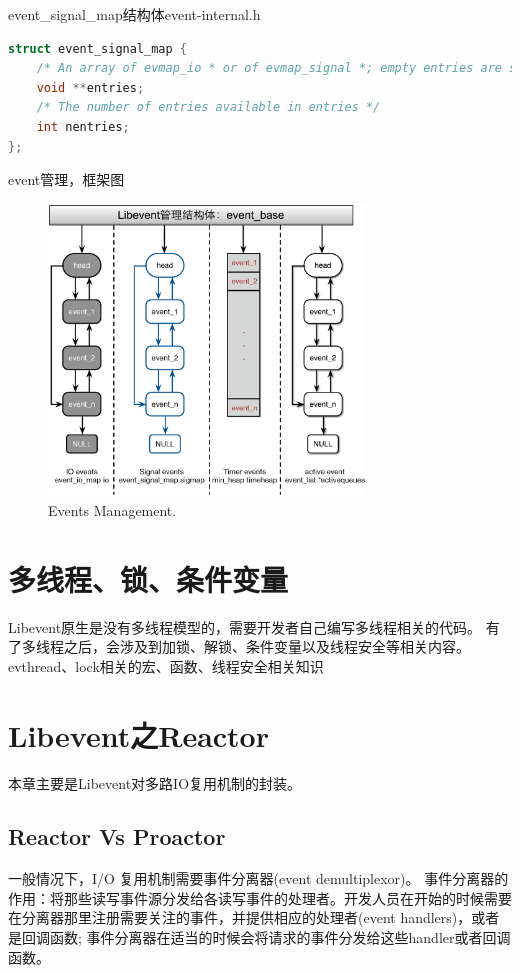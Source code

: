 \documentclass[11pt,a4paper]{article}
\begin{document}
event\_signal\_map结构体event-internal.h
\begin{lstlisting}[language=C]
struct event_signal_map {
	/* An array of evmap_io * or of evmap_signal *; empty entries are set to NULL. */
	void **entries;
	/* The number of entries available in entries */
	int nentries;
};
\end{lstlisting}

event管理，框架图

\begin{figure}[htb]
\begin{center}
\includegraphics [width=0.75\textwidth]{EventsManagement}
\caption{Events Management.}
\end{center}
\end{figure}

\newpage

\section{多线程、锁、条件变量}\label{S.ThreadLock}

Libevent原生是没有多线程模型的，需要开发者自己编写多线程相关的代码。
有了多线程之后，会涉及到加锁、解锁、条件变量以及线程安全等相关内容。
evthread、lock相关的宏、函数、线程安全相关知识

\newpage

\section{Libevent之Reactor}\label{S.Reactor}
本章主要是Libevent对多路IO复用机制的封装。

\subsection{Reactor Vs Proactor}
一般情况下，I/O 复用机制需要事件分离器(event demultiplexor)。 事件分离器的作用：将那些读写事件源分发给各读写事件的处理者。开发人员在开始的时候需要在分离器那里注册需要关注的事件，并提供相应的处理者(event handlers)，或者是回调函数; 事件分离器在适当的时候会将请求的事件分发给这些handler或者回调函数。
\end{document}
